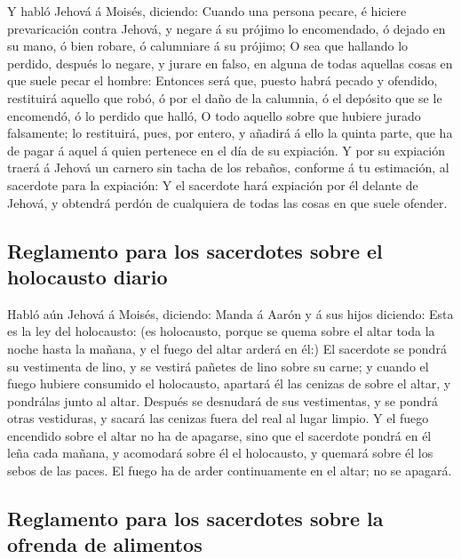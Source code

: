  Y habló Jehová á Moisés, diciendo:  Cuando una
persona pecare, é hiciere prevaricación contra Jehová, y negare á su
prójimo lo encomendado, ó dejado en su mano, ó bien robare, ó calumniare
á su prójimo;  O sea que hallando lo perdido, después lo
negare, y jurare en falso, en alguna de todas aquellas cosas en que
suele pecar el hombre:  Entonces será que, puesto habrá
pecado y ofendido, restituirá aquello que robó, ó por el daño de la
calumnia, ó el depósito que se le encomendó, ó lo perdido que halló,
 O todo aquello sobre que hubiere jurado falsamente; lo
restituirá, pues, por entero, y añadirá á ello la quinta parte, que ha
de pagar á aquel á quien pertenece en el día de su expiación.
 Y por su expiación traerá á Jehová un carnero sin tacha de
los rebaños, conforme á tu estimación, al sacerdote para la expiación:
 Y el sacerdote hará expiación por él delante de Jehová, y
obtendrá perdón de cualquiera de todas las cosas en que suele ofender.

\hypertarget{reglamento-para-los-sacerdotes-sobre-el-holocausto-diario}{%
\subsection{Reglamento para los sacerdotes sobre el holocausto
diario}\label{reglamento-para-los-sacerdotes-sobre-el-holocausto-diario}}

 Habló aún Jehová á Moisés, diciendo:  Manda á
Aarón y á sus hijos diciendo: Esta es la ley del holocausto: (es
holocausto, porque se quema sobre el altar toda la noche hasta la
mañana, y el fuego del altar arderá en él:)  El sacerdote
se pondrá su vestimenta de lino, y se vestirá pañetes de lino sobre su
carne; y cuando el fuego hubiere consumido el holocausto, apartará él
las cenizas de sobre el altar, y pondrálas junto al altar. 
Después se desnudará de sus vestimentas, y se pondrá otras vestiduras, y
sacará las cenizas fuera del real al lugar limpio.  Y el
fuego encendido sobre el altar no ha de apagarse, sino que el sacerdote
pondrá en él leña cada mañana, y acomodará sobre él el holocausto, y
quemará sobre él los sebos de las paces.  El fuego ha de
arder continuamente en el altar; no se apagará.

\hypertarget{reglamento-para-los-sacerdotes-sobre-la-ofrenda-de-alimentos}{%
\subsection{Reglamento para los sacerdotes sobre la ofrenda de
alimentos}\label{reglamento-para-los-sacerdotes-sobre-la-ofrenda-de-alimentos}}

